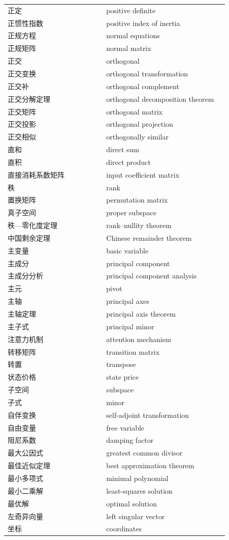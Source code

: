 {\begin{longtable}{p{0.42\linewidth}p{0.52\linewidth}}
		正定 & positive definite \\
		正惯性指数 & positive index of inertia \\
		正规方程 & normal equations \\
		正规矩阵 & normal matrix \\
		正交 & orthogonal \\
		正交变换 & orthogonal transformation \\
		正交补 & orthogonal complement \\
		正交分解定理 & orthogonal decomposition theorem \\
		正交矩阵 & orthogonal matrix \\
		正交投影 & orthogonal projection \\
		正交相似 & orthogonally similar \\
		直和 & direct sum \\
		直积 & direct product \\
		直接消耗系数矩阵 & input coefficient matrix \\
		秩 & rank \\
		置换矩阵 & permutation matrix \\
		真子空间 & proper subspace \\
		秩—零化度定理 & rank–nullity theorem \\
		中国剩余定理 & Chinese remainder theorem \\
		主变量 & basic variable \\
		主成分 & principal component \\
		主成分分析 & principal component analysis \\
		主元 & pivot \\
		主轴 & principal axes \\
		主轴定理 & principal axis theorem \\
		主子式 & principal minor \\
		注意力机制 & attention mechanism \\
		转移矩阵 & transition matrix \\
		转置 & transpose \\
		状态价格 & state price \\
		子空间 & subspace \\
		子式 & minor \\
		自伴变换 & self-adjoint transformation \\
		自由变量 & free variable \\
		阻尼系数 & damping factor \\
		最大公因式 & greatest common divisor \\
		最佳近似定理 & best approximation theorem \\
		最小多项式 & minimal polynomial \\
		最小二乘解 & least-squares solution \\
		最优解 & optimal solution \\
		左奇异向量 & left singular vector \\
		坐标 & coordinates \\
	\end{longtable}
}